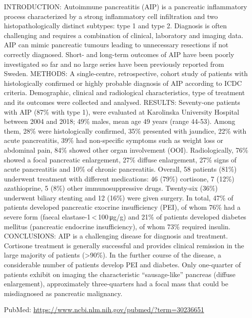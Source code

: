 \documentclass[]{article}
\begin{document}
INTRODUCTION: Autoimmune pancreatitis (AIP) is a pancreatic inflammatory
process characterized by a strong inflammatory cell infiltration and two
histopathologically distinct subtypes: type 1 and type 2. Diagnosis is
often challenging and requires a combination of clinical, laboratory and
imaging data. AIP can mimic pancreatic tumours leading to unnecessary
resections if not correctly diagnosed. Short- and long-term outcomes of
AIP have been poorly investigated so far and no large series have been
previously reported from Sweden. METHODS: A single-centre,
retrospective, cohort study of patients with histologically confirmed or
highly probable diagnosis of AIP according to ICDC criteria.
Demographic, clinical and radiological characteristics, type of
treatment and its outcomes were collected and analysed. RESULTS:
Seventy-one patients with AIP (87\% with type 1), were evaluated at
Karolinska University Hospital between 2004 and 2018; 49\% males, mean
age 49 years (range 44-53). Among them, 28\% were histologically
confirmed, 35\% presented with jaundice, 22\% with acute pancreatitis,
39\% had non-specific symptoms such as weight loss or abdominal pain,
84\% showed other organ involvement (OOI). Radiologically, 76\% showed a
focal pancreatic enlargement, 27\% diffuse enlargement, 27\% signs of
acute pancreatitis and 10\% of chronic pancreatitis. Overall, 58
patients (81\%) underwent treatment with different medications: 46
(79\%) cortisone, 7 (12\%) azathioprine, 5 (8\%) other immunosuppressive
drugs. Twenty-six (36\%) underwent biliary stenting and 12 (16\%) were
given surgery. In total, 47\% of patients developed pancreatic exocrine
insufficiency (PEI), of whom 76\% had a severe form (faecal
elastase-1\,\textless{}\,100\,μg/g) and 21\% of patients developed
diabetes mellitus (pancreatic endocrine insufficiency), of whom 73\%
required insulin. CONCLUSIONS: AIP is a challenging disease for
diagnosis and treatment. Cortisone treatment is generally successful and
provides clinical remission in the large majority of patients
(\textgreater{}90\%). In the further course of the disease, a
considerable number of patients develop PEI and diabetes. Only
one-quarter of patients exhibit on imaging the characteristic
``sausage-like'' pancreas (diffuse enlargement), approximately
three-quarters had a focal mass that could be misdiagnosed as pancreatic
malignancy.

PubMed: \url{https://www.ncbi.nlm.nih.gov/pubmed/?term=30236651}

{}

{}
\end{document}
